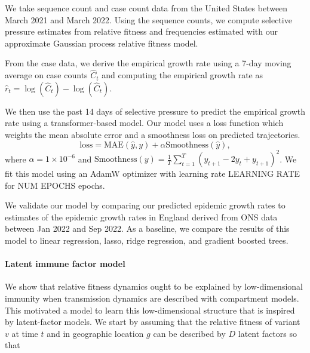 \documentclass[12pt,oneside,letterpaper]{article}
\begin{document}
We take sequence count and case count data from the United States between March 2021 and March 2022.
Using the sequence counts, we compute selective pressure estimates from relative fitness and frequencies estimated with our approximate Gaussian process relative fitness model.

From the case data, we derive the empirical growth rate using a 7-day moving average on case counts $\hat{C}_{t}$ and computing the empirical growth rate as $\hat{r}_{t} = \log(\hat{C}_{t}) - \log(\hat{C}_{t})$.

We then use the past 14 days of selective pressure to predict the empirical growth rate using a transformer-based model.
Our model uses a loss function which weights the mean absolute error and a smoothness loss on predicted trajectories.
\begin{equation*}
    \text{loss} = \text{MAE}(\hat{y}, y) + \alpha \text{Smoothness}(\hat{y}),
\end{equation*}
where $\alpha = 1\times 10^{-6}$ and $\text{Smoothness}(y) = \frac{1}{T}\sum_{t=1}^{T} (y_{t+1} - 2 y_{t} + y_{t+1})^{2}$.
We fit this model using an AdamW optimizer with learning rate LEARNING RATE for NUM EPOCHS epochs.

We validate our model by comparing our predicted epidemic growth rates to estimates of the epidemic growth rates in England derived from ONS data between Jan 2022 and Sep 2022.
As a baseline, we compare the results of this model to linear regression, lasso, ridge regression, and gradient boosted trees.



\paragraph{Latent immune factor model}%

We show that relative fitness dynamics ought to be explained by low-dimensional immunity when transmission dynamics are described with compartment models.
This motivated a model to learn this low-dimensional structure that is inspired by latent-factor models.
We start by assuming that the relative fitness of variant $v$ at time $t$ and in geographic location $g$ can be described by $D$ latent factors so that
\end{document}
